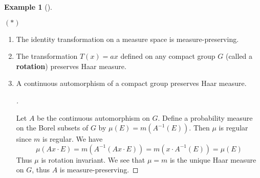 \documentclass{article}
\theoremstyle{definition}
\newtheorem{ex}{Example}
\newenvironment{proofs}[1][\proofname]{%
  \begin{proof}[#1]$ $\par\nobreak\ignorespaces
}{%
  \end{proof}
}
\newenvironment{exs}[1][]{%
  \begin{ex}[#1]$ $\par\nobreak\ignorespaces
}{%
  \end{ex}
}
\begin{document}
\begin{exs}
	$(*)$
	\begin{enumerate}
		\item The identity transformation on a measure space is measure-preserving.

		\item The transformation $T(x) = ax$ defined on any compact group $G$ (called a \textbf{rotation}) preserves Haar measure.

		\item A continuous automorphism of a compact group preserves Haar measure.

			\begin{proofs}
				Let $A$ be the continuous automorphism on $G$.
				Define a probability measure on the Borel subsets of $G$ by $\mu(E) = m(A^{-1}(E))$.
				Then $\mu$ is regular since $m$ is regular.
				We have
				\[
					\mu(Ax \cdot E) = m(A^{-1}(A x \cdot E)) = m(x \cdot A^{-1}(E)) = \mu(E)
				\]
				Thus $\mu$ is rotation invariant.
				We see that $\mu = m$ is the unique Haar measure on $G$, thus $A$ is measure-preserving.
			\end{proofs}
	\end{enumerate}
\end{exs}


	
\end{document}
